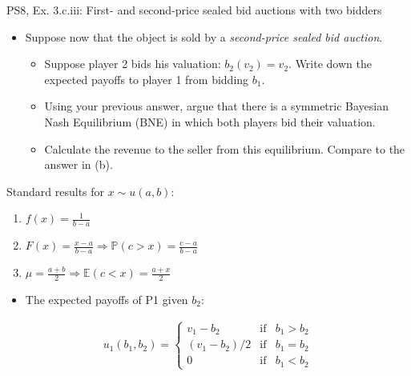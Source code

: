 \begin{frame}{PS8, Ex. 3.c.iii: First- and second-price sealed bid auctions with two bidders}
    \begin{multicols}{2}
      \begin{itemize}
        \item[(c)] Suppose now that the object is sold by a \textit{second-price sealed bid auction}.
        \begin{itemize}\normalsize
          \item[i.]   Suppose player 2 bids his valuation: $b_2(v_2) = v_2$. Write down the expected payoffs to player 1 from bidding $b_1$.
          \item[ii.]  Using your previous answer, argue that there is a symmetric Bayesian Nash Equilibrium (BNE) in which both players bid their valuation.
          \item[iii.] Calculate the revenue to the seller from this equilibrium. Compare to the answer in (b).
        \end{itemize}
      \end{itemize}
      Standard results for $x\sim u(a, b):$
      \vspace{-6pt}
      \begin{enumerate}
        \item[PDF:] $f(x)=\frac{1}{b-a}$
        \item[CDF:] $F(x)=\frac{x-a}{b-a}\Rightarrow\mathbb{P}(c>x)=\frac{c-a}{b-a}$
        \item[Mean:] $\mu=\frac{a+b}{2}\Rightarrow\mathbb{E}(c<x)=\frac{a+x}{2}$
      \end{enumerate}
      \vfill\null\columnbreak
      \begin{itemize}
        \item[(i)] The expected payoffs of P1 given $b_2$:
      \end{itemize}
      \vspace{-16pt}
      \begin{align*}
        u_1(b_1,b_2)=\left\{\begin{array}{lcl}
          v_1-b_2     & \text{if} & b_1>b_2 \\
          (v_1-b_2)/2 & \text{if} & b_1=b_2 \\
          0           & \text{if} & b_1<b_2
        \end{array}\right.
      \end{align*}
      \vspace{-18pt}
      \begin{itemize}

\end{itemize}
\end{multicols}
\end{frame}
